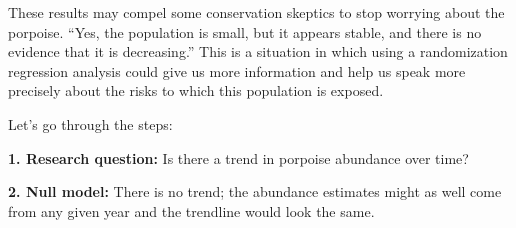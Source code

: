 \documentclass[
]{book}
\newenvironment{Shaded}{\begin{snugshade}}{\end{snugshade}}
\newcommand{\DataTypeTok}[1]{\textcolor[rgb]{0.13,0.29,0.53}{#1}}
\newcommand{\DecValTok}[1]{\textcolor[rgb]{0.00,0.00,0.81}{#1}}
\newcommand{\ErrorTok}[1]{\textcolor[rgb]{0.64,0.00,0.00}{\textbf{#1}}}
\newcommand{\FloatTok}[1]{\textcolor[rgb]{0.00,0.00,0.81}{#1}}
\newcommand{\KeywordTok}[1]{\textcolor[rgb]{0.13,0.29,0.53}{\textbf{#1}}}
\newcommand{\NormalTok}[1]{#1}
\newcommand{\OperatorTok}[1]{\textcolor[rgb]{0.81,0.36,0.00}{\textbf{#1}}}
\newcommand{\StringTok}[1]{\textcolor[rgb]{0.31,0.60,0.02}{#1}}
\begin{document}
\begin{Shaded}
\end{Shaded}

These results may compel some conservation skeptics to stop worrying about the porpoise. ``Yes, the population is small, but it appears stable, and there is no evidence that it is decreasing.'' This is a situation in which using a randomization regression analysis could give us more information and help us speak more precisely about the risks to which this population is exposed.

Let's go through the steps:

\textbf{1. Research question:} Is there a trend in porpoise abundance over time?

\textbf{2. Null model:} There is no trend; the abundance estimates might as well come from any given year and the trendline would look the same.
\end{document}
